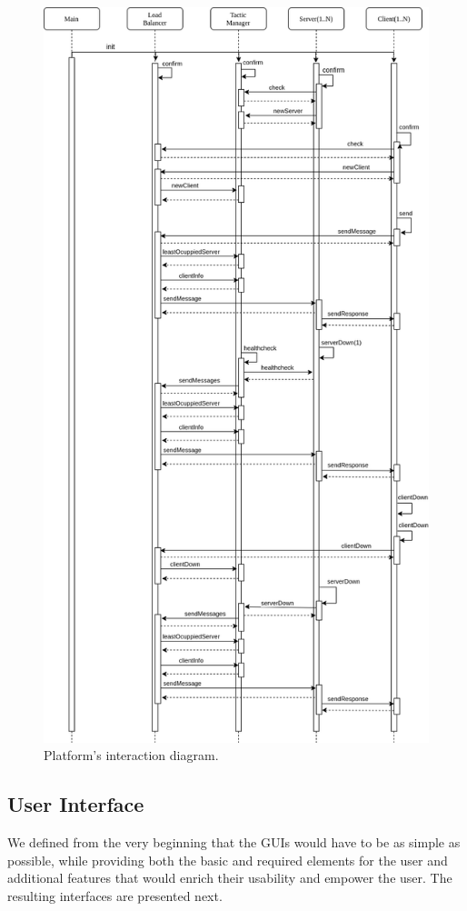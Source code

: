 \documentclass[12pt]{article}
\begin{document}
\begin{figure}[H]
  \centering
  \begin{minipage}{\textwidth}
    \centering
    \includegraphics[width=.75\linewidth]{img/pa3Interaction.png}
  \end{minipage}%
  \caption{Platform's interaction diagram.}
  \label{fig:pa3Interaction}
\end{figure} 

\newpage
\subsection{User Interface} \label{ui} %

We defined from the very beginning that the GUIs would have to be as simple as possible, while providing both the basic and required elements for the user and 
additional features that would enrich their usability and empower the user.
The resulting interfaces are presented next.
\end{document}
